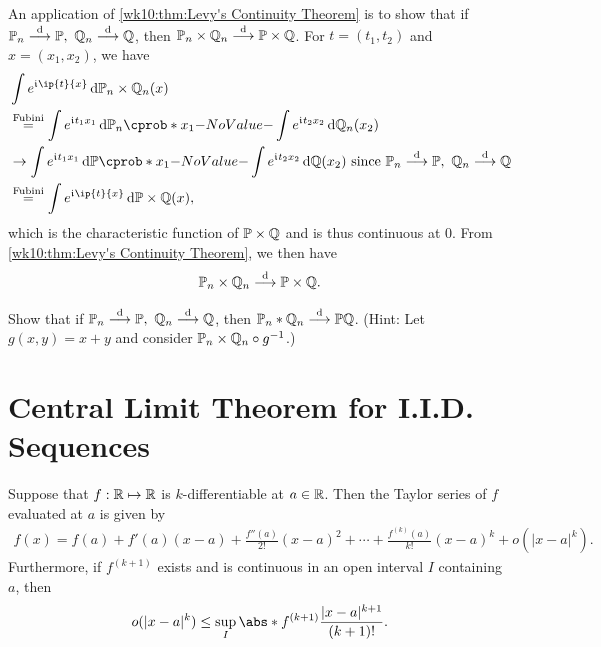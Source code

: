 \documentclass[12pt]{article}
\begin{document}
An application of \cref{wk10:thm:Levy's Continuity Theorem} is to show that if $\P_n\convd\P,\ \Rat_n\convd\Rat$, then $\P_n \times \Rat_n \convd \P \times \Rat$. For $t=(t_1,t_2)$ and $x=(x_1,x_2)$, we have
\begin{align*}
& \int e^{\iu \ip{t}{x}} \ud \P_n \times \Rat_n(x) \\
& \eqa{\text{Fubini}} \int e^{\iu t_1x_1} \ud \P_n(x_1) \int e^{\iu t_2x_2} \ud \Rat_n(x_2) \\
& \to \int e^{\iu t_1x_1} \ud \P(x_1) \int e^{\iu t_2x_2} \ud \Rat(x_2) \text{ since $\P_n\convd\P,\ \Rat_n\convd\Rat$}\\
& \eqa{\text{Fubini}} \int e^{\iu \ip{t}{x}} \ud \P \times \Rat(x), 
\end{align*}
which is the characteristic function of $\P \times \Rat$ and is thus continuous at 0. From \cref{wk10:thm:Levy's Continuity Theorem}, we then have
\begin{align*}
\P_n \times \Rat_n \convd \P \times \Rat.
\end{align*}

\begin{Exercise}\label{wk10:ex:P*Q}
Show that if $\P_n\convd\P,\ \Rat_n\convd\Rat$, then $\P_n * \Rat_n \convd \P * \Rat$. (Hint: Let $g(x,y)=x+y$ and consider $\P_n\times\Rat_n \circ g^{-1}$.)
\end{Exercise}

\section{Central Limit Theorem for I.I.D. Sequences}\label{wk10:sec:CLT_IID}

Suppose that $f:\mathbb{R} \mapsto \mathbb{R}$ is $k$-differentiable at $a \in \mathbb{R}$. Then the Taylor series of $f$ evaluated at $a$ is given by 
\begin{align*}
f(x)=f(a)+f'(a)(x-a)+\frac{f''(a)}{2!}(x-a)^2+\cdots+\frac{f^{(k)}(a)}{k!}(x-a)^k+o(|x-a|^k).
\end{align*}
Furthermore, if $f^{(k+1)}$ exists and is continuous in an open interval $I$ containing $a$, then 
\begin{align*}
o(|x-a|^k) \leq \sup_I {\abs*{f^{(k+1)}}\frac{|x-a|^{k+1}}{(k+1)!}}.
\end{align*}
\end{document}
